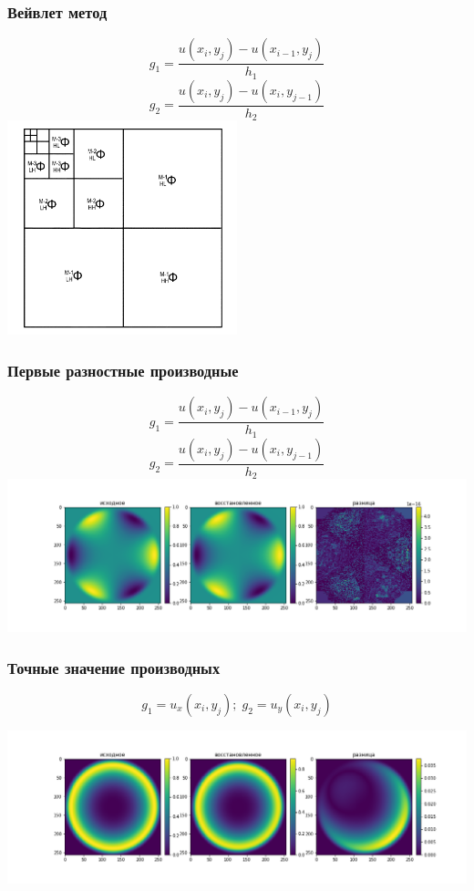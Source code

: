 \documentclass[11pt]{beamer}
\begin{document}
\begin{frame}
\frametitle{Вейвлет метод}
\begin{center}
			$$g_1= \frac{u(x_i,y_j) - u(x_{i-1},y_j)}{h_1}$$
			$$g_2= \frac{u(x_i,y_j) - u(x_i,y_{j-1})}{h_2}$$
\includegraphics[width=0.5\textwidth]{hwaf_decomp.png}

\end{center}
\end{frame}



\begin{frame}
\frametitle{Первые разностные производные}
\begin{center}
$$g_1= \frac{u(x_i,y_j) - u(x_{i-1},y_j)}{h_1}$$
$$g_2= \frac{u(x_i,y_j) - u(x_i,y_{j-1})}{h_2}$$
\includegraphics[width=1\textwidth]{Z_3^3.png}
\end{center}
\end{frame}

\begin{frame}
\frametitle{Точные значение производных}
$$g_1 = u_x(x_i,y_j);\; g_2 = u_y(x_i,y_j)$$
\begin{center}
\includegraphics[width=1\textwidth]{R_3^3_variant1.png}
\end{center}
\end{frame}
\end{document}
